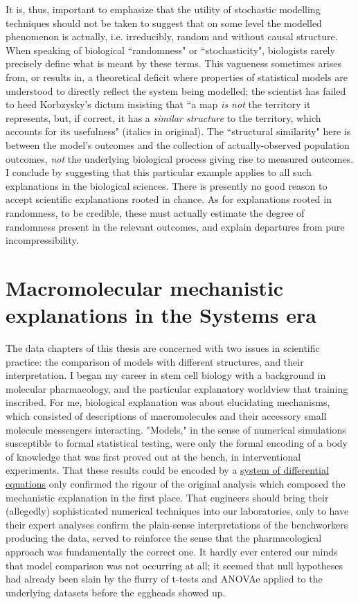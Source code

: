 It is, thus, important to emphasize that the utility of stochastic modelling techniques should not be taken to suggest that on some level the modelled phenomenon is actually, i.e. irreducibly, random and without causal structure. When speaking of biological ``randomness" or ``stochasticity", biologists rarely precisely define what is meant by these terms. This vagueness sometimes arises from, or results in, a theoretical deficit where properties of statistical models are understood to directly reflect the system being modelled; the scientist has failed to heed Korbzysky's dictum insisting that ``a map \textit{is not} the territory it represents, but, if correct, it has a \textit{similar structure} to the territory, which accounts for its usefulness" \cite{Korzybski2005} (italics in original). The ``structural similarity" here is between the model's outcomes and the collection of actually-observed population outcomes, \textit{not} the underlying biological process giving rise to measured outcomes. I conclude by suggesting that this particular example applies to all such explanations in the biological sciences. There is presently no good reason to accept scientific explanations rooted in chance. As for explanations rooted in randomness, to be credible, these must actually estimate the degree of randomness present in the relevant outcomes, and explain departures from pure incompressibility.


\section{Macromolecular mechanistic explanations in the Systems era}

The data chapters of this thesis are concerned with two issues in scientific practice: the comparison of models with different structures, and their interpretation. I began my career in stem cell biology with a background in molecular pharmacology, and the particular explanatory worldview that training inscribed. For me, biological explanation was about elucidating mechanisms, which consisted of descriptions of macromolecules and their accessory small molecule messengers interacting. "Models," in the sense of numerical simulations susceptible to formal statistical testing, were only the formal encoding of a body of knowledge that was first proved out at the bench, in interventional experiments. That these results could be encoded by a \hyperref[ssec:SODE]{system of differential equations} only confirmed the rigour of the original analysis which composed the mechanistic explanation in the first place. That engineers should bring their (allegedly) sophisticated numerical techniques into our laboratories, only to have their expert analyses confirm the plain-sense interpretations of the benchworkers producing the data, served to reinforce the sense that the pharmacological approach was fundamentally the correct one. It hardly ever entered our minds that model comparison was not occurring at all; it seemed that null hypotheses had already been slain by the flurry of t-tests and ANOVAe applied to the underlying datasets before the eggheads showed up.

